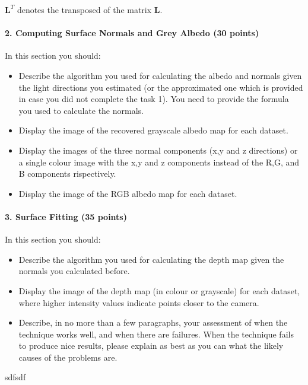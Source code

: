 \documentclass{paper}
\begin{document}
$\mathbf{L}^T$ denotes the transposed of the matrix $\mathbf{L}$.


\paragraph{2. Computing Surface Normals and Grey Albedo (30 points)}

In this section you should:

\begin{itemize}
\item Describe the algorithm you used for calculating the albedo and normals given the light directions you estimated (or the approximated one which is provided in case you did not complete the task 1). You need to provide the formula you used to calculate the normals.

\item Display the image of the recovered grayscale albedo map for each dataset.
\item Display the images of the three normal components (x,y and z directions) or a single colour image with the x,y and z components instead of the R,G, and B components rispectively.
\item Display the image of the RGB albedo map for each dataset. 
\end{itemize}



\paragraph{3. Surface Fitting (35 points)}

In this section you should:

\begin{itemize}
\item Describe the algorithm you used for calculating the depth map given the normals you calculated before.
\item Display the image of the depth map (in colour or grayscale) for each dataset, where higher intensity values indicate points closer to the camera.
\item Describe, in no more than a few paragraphs, your assessment of when the technique works well, and when there are failures. When the technique fails to produce nice results, please explain as best as you can what the likely causes of the problems are.
\end{itemize}






sdfsdf








 
\end{document}
